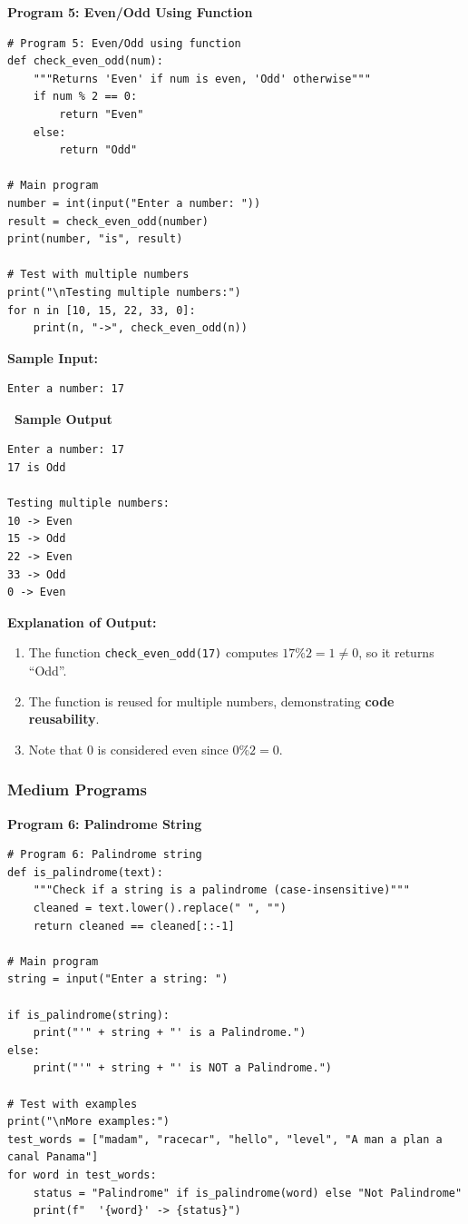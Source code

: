 \documentclass[12pt,a4paper]{article}
\newcommand{\outhead}{\noindent\colorbox{cmrgreen!25}%
  {\textbf{\small\color{cmrdark}~Sample Output~}}\par\vspace{-1pt}}
\begin{document}
\vspace{0.5cm}

\textbf{Program 5: Even/Odd Using Function}

\begin{lstlisting}
# Program 5: Even/Odd using function
def check_even_odd(num):
    """Returns 'Even' if num is even, 'Odd' otherwise"""
    if num % 2 == 0:
        return "Even"
    else:
        return "Odd"

# Main program
number = int(input("Enter a number: "))
result = check_even_odd(number)
print(number, "is", result)

# Test with multiple numbers
print("\nTesting multiple numbers:")
for n in [10, 15, 22, 33, 0]:
    print(n, "->", check_even_odd(n))
\end{lstlisting}

\textbf{Sample Input:}
\begin{verbatim}
Enter a number: 17
\end{verbatim}

\outhead
\begin{lstlisting}[style=outputstyle]
Enter a number: 17
17 is Odd

Testing multiple numbers:
10 -> Even
15 -> Odd
22 -> Even
33 -> Odd
0 -> Even
\end{lstlisting}

\textbf{Explanation of Output:}
\begin{enumerate}
  \item The function \texttt{check\_even\_odd(17)} computes $17 \% 2 = 1 \neq 0$, so it returns ``Odd''.
  \item The function is reused for multiple numbers, demonstrating \textbf{code reusability}.
  \item Note that 0 is considered even since $0 \% 2 = 0$.
\end{enumerate}

\subsubsection{Medium Programs}

\textbf{Program 6: Palindrome String}

\begin{lstlisting}
# Program 6: Palindrome string
def is_palindrome(text):
    """Check if a string is a palindrome (case-insensitive)"""
    cleaned = text.lower().replace(" ", "")
    return cleaned == cleaned[::-1]

# Main program
string = input("Enter a string: ")

if is_palindrome(string):
    print("'" + string + "' is a Palindrome.")
else:
    print("'" + string + "' is NOT a Palindrome.")

# Test with examples
print("\nMore examples:")
test_words = ["madam", "racecar", "hello", "level", "A man a plan a canal Panama"]
for word in test_words:
    status = "Palindrome" if is_palindrome(word) else "Not Palindrome"
    print(f"  '{word}' -> {status}")
\end{lstlisting}
\end{document}
